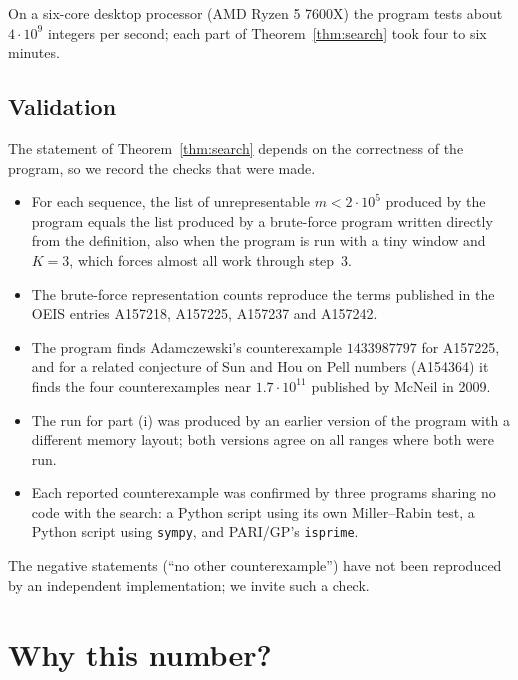 \documentclass[11pt]{article}
\theoremstyle{definition}
\theoremstyle{remark}
\begin{document}
On a six-core desktop processor (AMD Ryzen 5 7600X) the program tests about $4\cdot 10^{9}$ integers
per second; each part of Theorem~\ref{thm:search} took four to six minutes.

\subsection{Validation}
The statement of Theorem~\ref{thm:search} depends on the correctness of the program, so we record
the checks that were made.
\begin{itemize}
\item For each sequence, the list of unrepresentable $m<2\cdot 10^{5}$ produced by the program equals
the list produced by a brute-force program written directly from the definition, also when the
program is run with a tiny window and $K=3$, which forces almost all work through step~3.
\item The brute-force representation counts reproduce the terms published in the OEIS entries
A157218, A157225, A157237 and A157242.
\item The program finds Adamczewski's counterexample $1433987797$ for A157225, and for a related
conjecture of Sun and Hou on Pell numbers (A154364) it finds the four counterexamples near
$1.7\cdot 10^{11}$ published by McNeil in 2009.
\item The run for part (i) was produced by an earlier version of the program with a different
memory layout; both versions agree on all ranges where both were run.
\item Each reported counterexample was confirmed by three programs sharing no code with the search:
a Python script using its own Miller--Rabin test, a Python script using \texttt{sympy}, and PARI/GP's
\texttt{isprime}.
\end{itemize}
The negative statements (``no other counterexample'') have not been reproduced by an independent
implementation; we invite such a check.

\section{Why this number?}\label{sec:structure}
\end{document}
